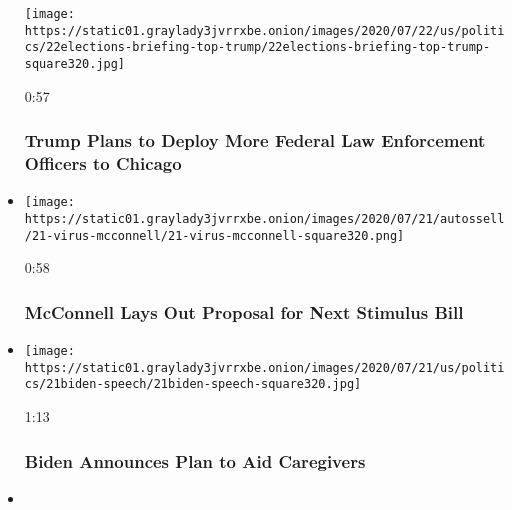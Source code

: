 \begin{itemize}
  \texttt{[image: https://static01.graylady3jvrrxbe.onion/images/2020/07/22/us/politics/22elections-briefing-top-trump/22elections-briefing-top-trump-square320.jpg]}

  0:57

  \hypertarget{trump-plans-to-deploy-more-federal-law-enforcement-officers-to-chicago}{%
  \subsubsection{Trump Plans to Deploy More Federal Law Enforcement
  Officers to
  Chicago}\label{trump-plans-to-deploy-more-federal-law-enforcement-officers-to-chicago}}
\item
  \href{https://www.nytimes3xbfgragh.onion/video/us/100000007250230/mcconnell-proposal-relief-package.html?action=click\&module=video-series-bar\&region=header\&pgtype=Article\&playlistId=video/us-politics}{}

  \texttt{[image: https://static01.graylady3jvrrxbe.onion/images/2020/07/21/autossell/21-virus-mcconnell/21-virus-mcconnell-square320.png]}

  0:58

  \hypertarget{mcconnell-lays-out-proposal-for-next-stimulus-bill}{%
  \subsubsection{McConnell Lays Out Proposal for Next Stimulus
  Bill}\label{mcconnell-lays-out-proposal-for-next-stimulus-bill}}
\item
  \href{https://www.nytimes3xbfgragh.onion/video/us/100000007249436/biden-announces-plan-to-aid-caregivers.html?action=click\&module=video-series-bar\&region=header\&pgtype=Article\&playlistId=video/us-politics}{}

  \texttt{[image: https://static01.graylady3jvrrxbe.onion/images/2020/07/21/us/politics/21biden-speech/21biden-speech-square320.jpg]}

  1:13

  \hypertarget{biden-announces-plan-to-aid-caregivers}{%
  \subsubsection{Biden Announces Plan to Aid
  Caregivers}\label{biden-announces-plan-to-aid-caregivers}}
\item
  \href{https://www.nytimes3xbfgragh.onion/video/us/100000007248132/biden-muslim-voters.html?action=click\&module=video-series-bar\&region=header\&pgtype=Article\&playlistId=video/us-politics}{}


\end{itemize}
